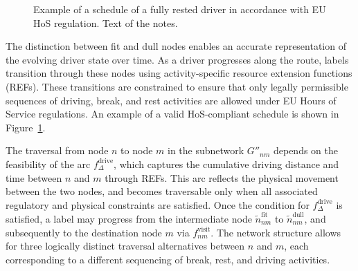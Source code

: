 \documentclass[trsc,dblanonrev]{informs4}
\begin{document}
\begin{figure}
\FIGURE
{}
{Example of a schedule of a fully rested driver in accordance with EU HoS regulation. \label{fig:driver_schedule}}
{Text of the notes.}
\end{figure}

The distinction between fit and dull nodes enables an accurate representation of the evolving driver state over time. As a driver progresses along the route, labels transition through these nodes using activity-specific resource extension functions (REFs). These transitions are constrained to ensure that only legally permissible sequences of driving, break, and rest activities are allowed under EU Hours of Service regulations. An example of a valid HoS-compliant schedule is shown in Figure~\ref{fig:driver_schedule}.

The traversal from node \( n \) to node \( m \) in the subnetwork \( G''_{nm} \) depends on the feasibility of the arc \( f^{\text{drive}}_{\Delta} \), which captures the cumulative driving distance and time between \( n \) and \( m \) through REFs. This arc reflects the physical movement between the two nodes, and becomes traversable only when all associated regulatory and physical constraints are satisfied. Once the condition for \( f^{\text{drive}}_{\Delta} \) is satisfied, a label may progress from the intermediate node \( \tilde{n}^{\text{fit}}_{nm} \) to \( \tilde{n}^{\text{dull}}_{nm} \), and subsequently to the destination node \( m \) via \( f^{\text{visit}}_{nm} \). The network structure allows for three logically distinct traversal alternatives between \( n \) and \( m \), each corresponding to a different sequencing of break, rest, and driving activities.
\end{document}
